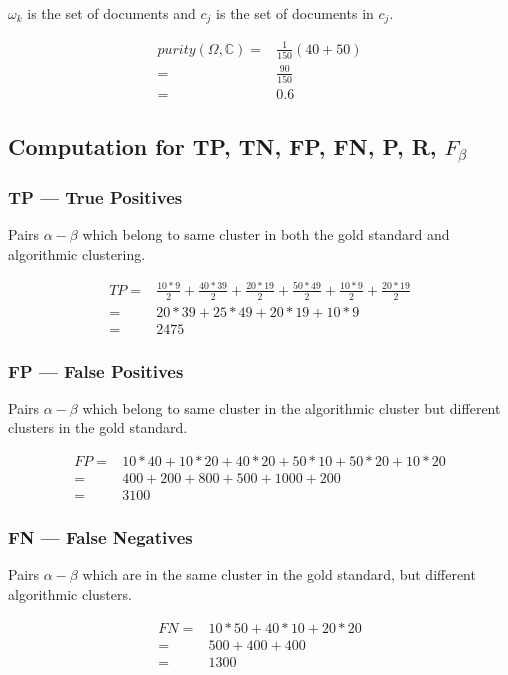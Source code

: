 \documentclass{article}
\begin{document}
$\omega_{k}$ is the set of documents and $ c_{j} $ is the set of documents in $c_{j}$.

\begin{align*}
  purity(\Omega, \mathbb{C}) =& \frac{1}{150} ( 40 + 50 )\\
  =& \frac{90}{150}\\
  =& 0.6
\end{align*}

\subsection{Computation for TP, TN, FP, FN, P, R, $F_{\beta}$ }
\subsubsection{TP --- True Positives}
Pairs $ \alpha -  \beta $ which belong to same cluster in both the gold standard and algorithmic clustering.

\begin{align*}
  TP =& \frac{10 * 9}{2} + \frac{40 * 39}{2} + \frac{20 * 19}{2} + \frac{50 * 49}{2} + \frac{10 * 9}{2} + \frac{20 * 19}{2} \\
  =& 20*39 + 25*49 + 20*19 + 10*9 \\
  =& 2475
\end{align*}

\subsubsection{FP --- False Positives}
Pairs $ \alpha -  \beta $ which belong to same cluster in the algorithmic cluster but different clusters in the gold standard.

\begin{align*}
  FP =& 10*40 + 10*20 + 40*20 + 50*10 + 50*20 + 10*20 \\
  =& 400 + 200 + 800 + 500 + 1000 + 200 \\
  =& 3100
\end{align*}

\subsubsection{FN --- False Negatives}
Pairs $ \alpha -  \beta $ which are in the same cluster in the gold standard, but different algorithmic clusters.

\begin{align*}
  FN =& 10*50 + 40*10 + 20*20 \\
  =& 500 + 400 + 400 \\
  =& 1300
\end{align*}
\end{document}

